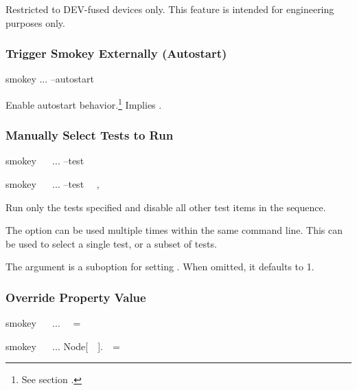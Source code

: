 Restricted to DEV-fused devices only.  This feature is intended for engineering
purposes only.

\subsubsection{Trigger Smokey Externally (Autostart)}

\begin{CommandLine}
smokey ... --autostart
\end{CommandLine}

Enable autostart behavior.\footnote{See section .}
Implies .

\subsubsection{Manually Select Tests to Run}

\begin{CommandLine}
smokey ~~ ... --test ~~
\end{CommandLine}

\begin{CommandLine}
smokey ~~ ... --test ~~,~~
\end{CommandLine}

Run only the tests specified and disable all other test items in the sequence.

The  option can be used multiple times within the same command
line.  This can be used to select a single test, or a subset of tests.

The  argument is a suboption for setting
.  When omitted, it defaults to 1.

\subsubsection{Override Property Value}

\begin{CommandLine}
smokey ~~ ... ~~=~~
\end{CommandLine}

\begin{CommandLine}
smokey ~~ ... Node[~~].~~=~~
\end{CommandLine}

